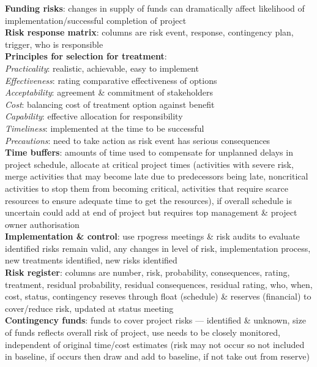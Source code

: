 \documentclass[a4paper]{article}
\begin{document}
\begin{multicols}{3}
        \textbf{Funding risks}: changes in supply of funds can dramatically affect likelihood of implementation/successful completion of project\\
        \textbf{Risk response matrix}: columns are risk event, response, contingency plan, trigger, who is responsible\\
        \textbf{Principles for selection for treatment}:\\
        \textit{Practicality}: realistic, achievable, easy to implement\\
        \textit{Effectiveness}: rating comparative effectiveness of options\\
        \textit{Acceptability}: agreement \& commitment of stakeholders\\
        \textit{Cost}: balancing cost of treatment option against benefit\\
        \textit{Capability}: effective allocation for responsibility\\
        \textit{Timeliness}: implemented at the time to be successful\\
        \textit{Precautions}: need to take action as risk event has serious consequences\\
        \textbf{Time buffers}: amounts of time used to compensate for unplanned delays in project schedule, allocate at critical project times (activities with severe risk, merge activities that may become late due to predecessors being late, noncritical activities to stop them from becoming critical, activities that require scarce resources to ensure adequate time to get the resources), if overall schedule is uncertain could add at end of project but requires top management \& project owner authorisation\\
        \textbf{Implementation \& control}: use rpogress meetings \& risk audits to evaluate identified risks remain valid, any changes in level of risk, implementation process, new treatments identified, new risks identified\\
        \textbf{Risk register}: columns are number, risk, probability, consequences, rating, treatment, residual probability, residual consequences, residual rating, who, when, cost, status, contingency reseves through float (schedule) \& reserves (financial) to cover/reduce risk, updated at status meeting\\
        \textbf{Contingency funds}: funds to cover project risks --- identified \& unknown, size of funds reflects overall risk of project, use needs to be closely monitored, independent of original time/cost estimates (risk may not occur so not included in baseline, if occurs then draw and add to baseline, if not take out from reserve)\\

\end{multicols}
\end{document}
